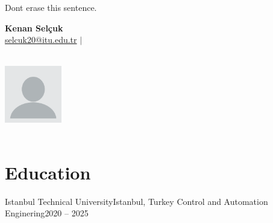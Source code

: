\label{ResumeTwo} %
\thesisspacing %


{\color{white}Dont erase this sentence.}
\medskip



\begin{minipage}{0.7\textwidth}
    \textbf{\Huge Kenan Selçuk} \\[5pt]
    \small \href{mailto:youremail@example.com}{selcuk20@itu.edu.tr} $|$ 

\end{minipage}
\begin{minipage}{0.3\textwidth}
    \begin{flushright}
        \includegraphics[width=2.5cm, height=3.5cm]{imgs/your_photo.png} %
    \end{flushright}
\end{minipage}

\section*{Education}
\begin{itemize}[leftmargin=*]
    \resumeEntry
        {Istanbul Technical University}{Istanbul, Turkey}
        {Control and Automation Enginering}{2020 – 2025}
\end{itemize}


